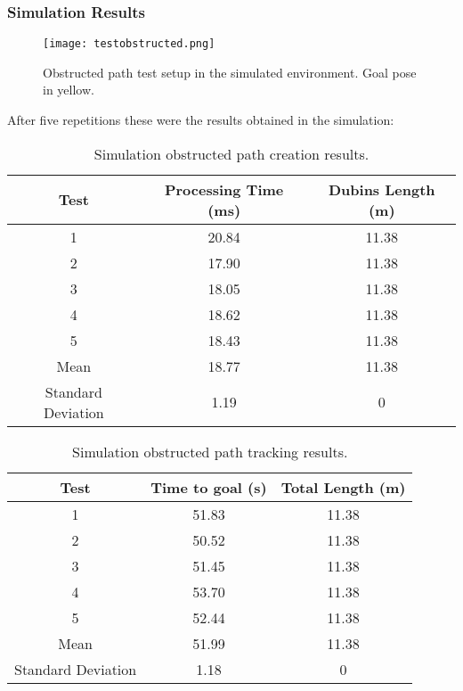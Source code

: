 \subsubsection{Simulation Results}

\begin{figure}[h]
    \centering
    \texttt{[image: testobstructed.png]}
    \caption{Obstructed path test setup in the simulated environment. Goal pose in yellow.}
    \label{fig:obstructed_path}
\end{figure}

After five repetitions these were the results obtained in the simulation:

\begin{table}[H]
    \centering
    \caption{Simulation obstructed path creation results.}
    \begin{tabular}{|c|c|c|}
        \hline
        \textbf{Test} & \textbf{Processing Time (ms)} & \textbf{Dubins Length (m)}  \\
        \hline
         1 & 20.84 & 11.38 \\
        \hline
         2 & 17.90 & 11.38 \\
         \hline
         3 & 18.05 & 11.38 \\
         \hline
         4 & 18.62 & 11.38 \\
         \hline
         5 & 18.43 & 11.38 \\
         \hline
        Mean & 18.77 & 11.38 \\
        \hline
        Standard Deviation & 1.19 & 0 \\
        \hline
    \end{tabular}
    \label{tab:obstructed_path_results1}
\end{table}
\begin{table}[H]
    \centering
    \caption{Simulation obstructed path tracking results.}
    \begin{tabular}{|c|c|c|}
        \hline
        \textbf{Test} & \textbf{Time to goal (s)} & \textbf{Total Length (m)} \\
         \hline
         1 & 51.83 & 11.38 \\
         \hline
         2 & 50.52 & 11.38 \\
         \hline
         3 & 51.45 & 11.38 \\
         \hline
         4 & 53.70 & 11.38 \\
         \hline
         5 & 52.44 & 11.38 \\
         \hline
        Mean & 51.99 & 11.38 \\
        \hline
        Standard Deviation & 1.18 & 0 \\
        \hline
    \end{tabular}
    \label{tab:obstructed_path_results2}
\end{table}
\clearpage

